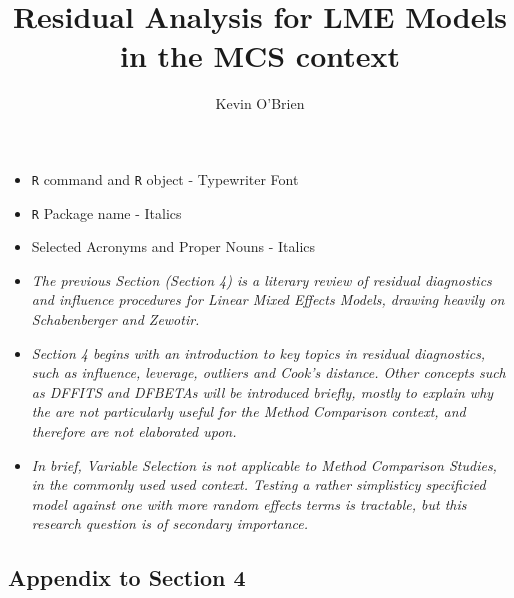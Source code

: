 \documentclass[a4paper,12pt]{article}
\title{Residual Analysis for LME Models in the MCS context}
\author{Kevin O'Brien}
\begin{document}
	
	\maketitle

\bigskip
\begin{framed} 
\begin{itemize}
	\item \texttt{R} command and \texttt{R} object - Typewriter Font
	\item \texttt{R} Package name - Italics
	\item Selected Acronyms and Proper Nouns - Italics
\end{itemize}
\end{framed}
\newpage
%










\newpage
\begin{itemize}
\item \textit{
	The previous Section (Section 4) is a literary review of residual diagnostics and influence procedures
	for Linear Mixed Effects Models, drawing heavily on Schabenberger and Zewotir.}
	
\item \textit{	Section 4 begins with an introduction to key topics in residual diagnostics, such as influence, leverage, outliers
	and Cook's distance. Other concepts such as DFFITS and DFBETAs will be introduced briefly, mostly to explain why the are not particularly useful for
	the Method Comparison context, and therefore are not elaborated upon.}
	
\item \textit{	In brief, Variable Selection is not applicable to Method Comparison Studies, in the 
	commonly used used context. 
	Testing a rather simplisticy specificied model against one with more random effects terms is tractable, but this research question is of secondary importance.}
\end{itemize}

\newpage
\subsection*{Appendix to Section 4}
\end{document}
